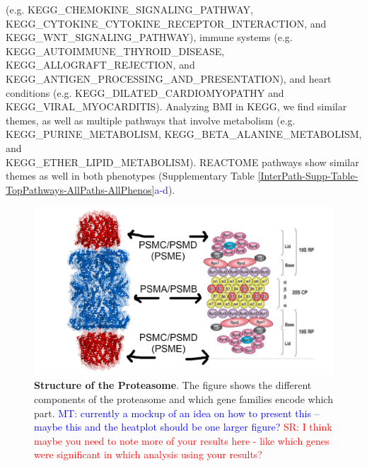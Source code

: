 \documentclass[12pt,a4paper]{article}
\begin{document}
(e.g. KEGG\_CHEMOKINE\_SIGNALING\_PATHWAY, KEGG\_CYTOKINE\_CYTOKINE\_RECEPTOR\_INTERACTION, and \\ KEGG\_WNT\_SIGNALING\_PATHWAY), immune systems (e.g. \\ KEGG\_AUTOIMMUNE\_THYROID\_DISEASE, KEGG\_ALLOGRAFT\_REJECTION, and KEGG\_ANTIGEN\_PROCESSING\_AND\_PRESENTATION), and heart conditions (e.g. KEGG\_DILATED\_CARDIOMYOPATHY and \\ KEGG\_VIRAL\_MYOCARDITIS). Analyzing BMI in KEGG, we find similar themes, as well as multiple pathways that involve metabolism (e.g. KEGG\_PURINE\_METABOLISM, KEGG\_BETA\_ALANINE\_METABOLISM, and \\ KEGG\_ETHER\_LIPID\_METABOLISM). REACTOME pathways show similar themes as well in both phenotypes (Supplementary Table \ref{InterPath-Supp-Table-TopPathways-AllPaths-AllPhenos}\textcolor{blue}{a-d}).


\begin{figure}[htb]
\centering
\includegraphics[scale=.2]{Images/Main/MockUp1.png}
\caption[TBD]{\textbf{Structure of the Proteasome}. The figure shows the different components of the proteasome and which gene families encode which part. \textcolor{blue}{MT: currently a mockup of an idea on how to present this -- maybe this and the heatplot should be one larger figure? } \textcolor{red}{SR: I think maybe you need to note more of your results here - like which genes were significant in which analysis using your results?}
}
\label{InterPath-Main-Figure-Proteasome-Schematic}
\end{figure}
\end{document}
